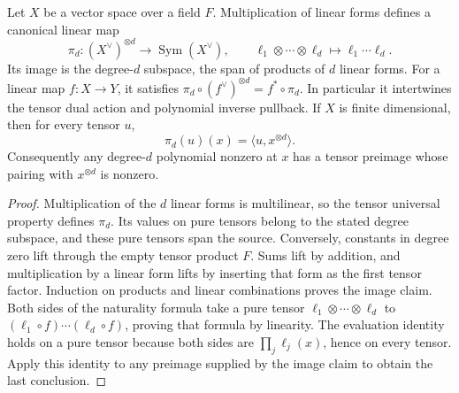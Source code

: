 \begin{lemma}
\label{lem:polynomial-tensor-quotient}
\leanok
Let $X$ be a vector space over a field $F$. Multiplication of linear
forms defines a canonical linear map
\[
 \pi_d:(X^\vee)^{\otimes d}\longrightarrow\operatorname{Sym}(X^\vee),
 \qquad \ell_1\otimes\cdots\otimes\ell_d\longmapsto\ell_1\cdots\ell_d.
\]
Its image is the degree-$d$ subspace, the span of products of $d$ linear
forms. For a linear map $f:X\to Y$, it satisfies
$\pi_d\circ(f^\vee)^{\otimes d}=f^*\circ\pi_d$. In particular it
intertwines the tensor dual action and polynomial inverse pullback.
If $X$ is finite dimensional, then for every tensor $u$,
\[
 \pi_d(u)(x)=\langle u,x^{\otimes d}\rangle.
\]
Consequently any degree-$d$ polynomial nonzero at $x$ has a tensor
preimage whose pairing with $x^{\otimes d}$ is nonzero.
\end{lemma}
\begin{proof}
Multiplication of the $d$ linear forms is multilinear, so the tensor
universal property defines $\pi_d$. Its values on pure tensors belong
to the stated degree subspace, and these pure tensors span the source.
Conversely, constants in degree zero lift through the empty tensor
product $F$. Sums lift by addition, and multiplication by a linear
form lifts by inserting that form as the first tensor factor.
Induction on products and linear combinations proves the image claim.
Both sides of the naturality formula take a pure tensor
$\ell_1\otimes\cdots\otimes\ell_d$ to
$(\ell_1\circ f)\cdots(\ell_d\circ f)$, proving that formula by linearity.
The evaluation identity holds on a pure tensor because both sides are
$\prod_j\ell_j(x)$, hence on every tensor. Apply this identity to any
preimage supplied by the image claim to obtain the last conclusion.
\end{proof}

